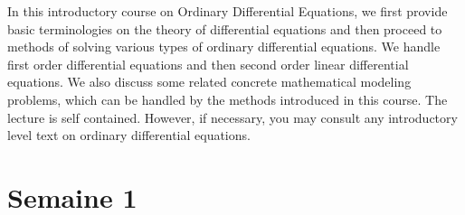 



In this introductory course on Ordinary Differential Equations, we first provide basic terminologies on the theory of differential equations and then proceed to methods of solving various types of ordinary differential equations. We handle first order differential equations and then second order linear differential equations. We also discuss some related concrete mathematical modeling problems, which can be handled by the methods introduced in this course. The lecture is self contained. However, if necessary, you may consult any introductory level text on ordinary differential equations. 

\section*{Semaine 1}

